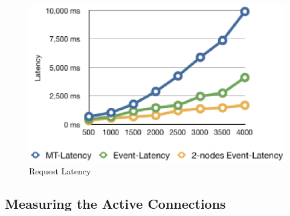 \begin{figure}[htb!]
\centering%
    \includegraphics[scale=0.60]{figures/event_thread_latency.eps}
    \caption{Request Latency}
    \label{fig:memory}
\end{figure}

\subsection{Measuring the Active Connections\\}

